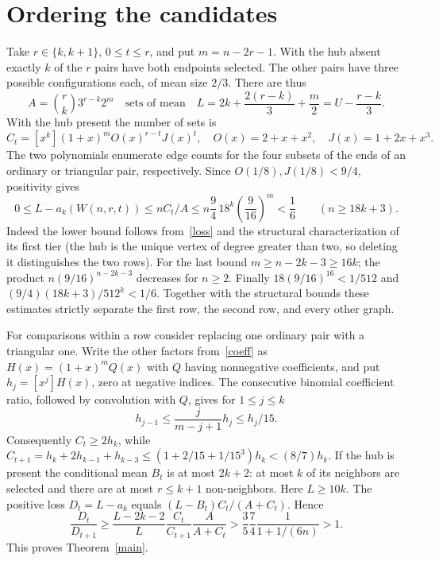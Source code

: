 \documentclass[11pt,a4paper]{article}
\newcommand{\av}{a}
\begin{document}
\section{Ordering the candidates}
Take $r\in\{k,k+1\}$, $0\le t\le r$, and put $m=n-2r-1$. With the hub absent exactly $k$ of the $r$ pairs have both endpoints selected. The other pairs have three possible configurations each, of mean size $2/3$. There are thus
\[
A=\binom{r}{k}3^{r-k}2^m
\quad\text{sets of mean}\quad
L=2k+\frac{2(r-k)}3+\frac m2=U-\frac{r-k}3.
\]
With the hub present the number of sets is
\begin{equation}\label{coeff}
C_t=[x^k](1+x)^m O(x)^{r-t} J(x)^t,\quad
O(x)=2+x+x^2,\quad J(x)=1+2x+x^3.
\end{equation}
The two polynomials enumerate edge counts for the four subsets of the ends of an ordinary or triangular pair, respectively. Since $O(1/8),J(1/8)<9/4$, positivity gives
\begin{equation}\label{err}
0\le L-\av_k(W(n,r,t))\le n C_t/A
   \le n\frac94\,18^k\left(\frac9{16}\right)^m < \frac16
   \qquad(n\ge18k+3).
\end{equation}
Indeed the lower bound follows from~\eqref{loss} and the structural characterization of its first tier (the hub is the unique vertex of degree greater than two, so deleting it distinguishes the two rows). For the last bound $m\ge n-2k-3\ge16k$; the product $n(9/16)^{n-2k-3}$ decreases for $n\ge2$. Finally $18(9/16)^{16}<1/512$ and $(9/4)(18k+3)/512^k<1/6$. Together with the structural bounds these estimates strictly separate the first row, the second row, and every other graph.

For comparisons within a row consider replacing one ordinary pair with a triangular one. Write the other factors from~\eqref{coeff} as $H(x)=(1+x)^m Q(x)$ with $Q$ having nonnegative coefficients, and put $h_j=[x^j]H(x)$, zero at negative indices. The consecutive binomial coefficient ratio, followed by convolution with $Q$, gives for $1\le j\le k$
\[
h_{j-1}\le \frac{j}{m-j+1} h_j\le h_j/15.
\]
Consequently $C_t\ge2h_k$, while
$C_{t+1}=h_k+2h_{k-1}+h_{k-3}\le(1+2/15+1/15^3)h_k<(8/7)h_k$.
If the hub is present the conditional mean $B_t$ is at most $2k+2$: at most $k$ of its neighbors are selected and there are at most $r\le k+1$ non-neighbors. Here $L\ge10k$. The positive loss $D_t=L-\av_k$ equals $(L-B_t)C_t/(A+C_t)$. Hence
\[
\frac{D_t}{D_{t+1}}
\ge\frac{L-2k-2}{L}\frac{C_t}{C_{t+1}}\frac{A}{A+C_t}
> \frac35\frac74\frac{1}{1+1/(6n)}>1.
\]
This proves Theorem~\ref{main}.
\end{document}
